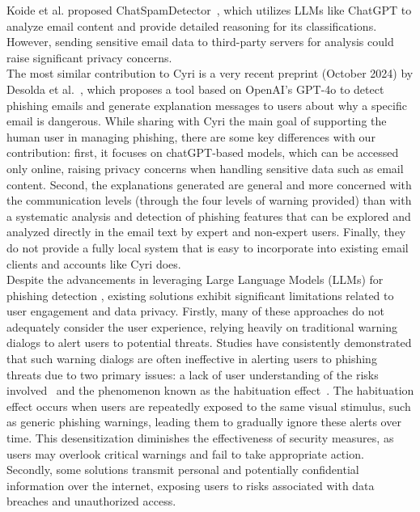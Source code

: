 Koide et al. proposed ChatSpamDetector~\cite{b27}, which utilizes LLMs like ChatGPT to analyze email content and provide detailed reasoning for its classifications. However, sending sensitive email data to third-party servers for analysis could raise significant privacy concerns.\\
The most similar contribution to Cyri is a very recent preprint (October 2024) by Desolda et al.~\cite{b39}, which proposes a tool based on OpenAI's GPT-4o to detect phishing emails and generate explanation messages to users about why a specific email is dangerous. While sharing with Cyri the main goal of supporting the human user in managing phishing, there are some key differences with our contribution: first, it focuses on chatGPT-based models, which can be accessed only online, raising privacy concerns when handling sensitive data such as email content. Second, the explanations generated are general and more concerned with the communication levels (through the four levels of warning provided) than with a systematic analysis and detection of phishing features that can be explored and analyzed directly in the email text by expert and non-expert users. Finally, they do not provide a fully local system that is easy to incorporate into existing email clients and accounts like Cyri does.
\\
Despite the advancements in leveraging Large Language Models (LLMs) for phishing detection \cite{b27, b28}, existing solutions exhibit significant limitations related to user engagement and data privacy. Firstly, many of these approaches do not adequately consider the user experience, relying heavily on traditional warning dialogs to alert users to potential threats. Studies have consistently demonstrated that such warning dialogs are often ineffective in alerting users to phishing threats due to two primary issues: a lack of user understanding of the risks involved~\cite{b22} and the phenomenon known as the habituation effect~\cite{b23}. The habituation effect occurs when users are repeatedly exposed to the same visual stimulus, such as generic phishing warnings, leading them to gradually ignore these alerts over time. This desensitization diminishes the effectiveness of security measures, as users may overlook critical warnings and fail to take appropriate action.\\
Secondly, some solutions transmit personal and potentially confidential information over the internet, exposing users to risks associated with data breaches and unauthorized access. 

